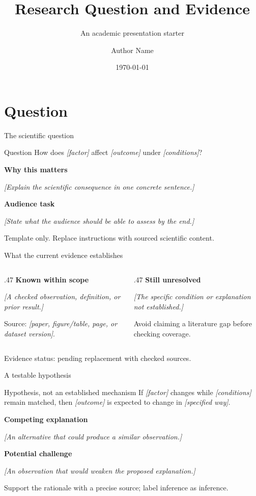 \documentclass[11pt,aspectratio=169]{beamer}
\title[Scientific argument]{Research Question and Evidence}
\subtitle{An academic presentation starter}
\author{Author Name}
\institute{Research Group}
\date{\today}
\newcommand{\evidencesource}[1]{%
  \par\vfill{\fontsize{8}{9.5}\selectfont\color{black!65}#1\par}}
\newcommand{\slot}[1]{\textit{[#1]}}
\begin{document}
\begin{frame}[plain]
  \titlepage
\end{frame}

\section{Question}
\begin{frame}{The scientific question}
  \begin{block}{Question}
    How does \slot{factor} affect \slot{outcome} under \slot{conditions}?
  \end{block}
  \medskip
  \textbf{Why this matters}\par
  \slot{Explain the scientific consequence in one concrete sentence.}\par
  \medskip
  \textbf{Audience task}\par
  \slot{State what the audience should be able to assess by the end.}
  \evidencesource{Template only. Replace instructions with sourced scientific content.}
\end{frame}

\begin{frame}{What the current evidence establishes}
  \begin{columns}[T,onlytextwidth]
    \begin{column}{.47\textwidth}
      \textbf{Known within scope}\par\medskip
      \slot{A checked observation, definition, or prior result.}\par\medskip
      Source: \slot{paper, figure/table, page, or dataset version}.
    \end{column}
    \begin{column}{.47\textwidth}
      \textbf{Still unresolved}\par\medskip
      \slot{The specific condition or explanation not established.}\par\medskip
      Avoid claiming a literature gap before checking coverage.
    \end{column}
  \end{columns}
  \evidencesource{Evidence status: pending replacement with checked sources.}
\end{frame}

\begin{frame}{A testable hypothesis}
  \begin{block}{Hypothesis, not an established mechanism}
    If \slot{factor} changes while \slot{conditions} remain matched,
    then \slot{outcome} is expected to change in \slot{specified way}.
  \end{block}
  \medskip
  \textbf{Competing explanation}\par
  \slot{An alternative that could produce a similar observation.}\par
  \medskip
  \textbf{Potential challenge}\par
  \slot{An observation that would weaken the proposed explanation.}
  \evidencesource{Support the rationale with a precise source; label inference as inference.}
\end{frame}
\end{document}
